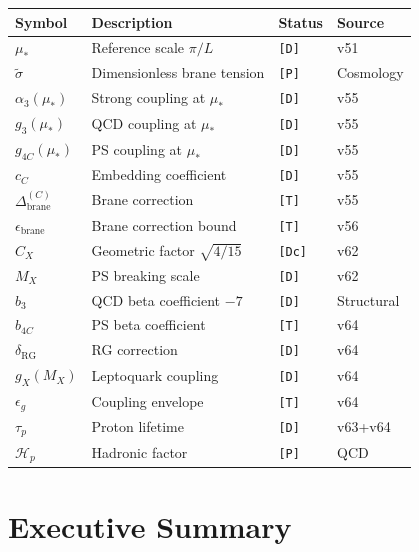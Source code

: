 \documentclass[11pt,a4paper]{article}
\newcommand{\tagD}{\textcolor{green!50!black}{\texttt{[D]}}}
\newcommand{\tagDc}{\textcolor{blue!70!black}{\texttt{[Dc]}}}
\newcommand{\tagP}{\textcolor{orange!80!black}{\texttt{[P]}}}
\newcommand{\tagT}{\textcolor{cyan!70!black}{\texttt{[T]}}}
\theoremstyle{definition}
\begin{document}
\begin{center}
\begin{longtable}{llll}
\toprule
Symbol & Description & Status & Source \\
\midrule
\endhead
$\mu_*$ & Reference scale $\pi/L$ & \tagD{} & v51 \\
$\tilde{\sigma}$ & Dimensionless brane tension & \tagP{} & Cosmology \\
$\alpha_3(\mu_*)$ & Strong coupling at $\mu_*$ & \tagD{} & v55 \\
$g_3(\mu_*)$ & QCD coupling at $\mu_*$ & \tagD{} & v55 \\
$g_{4C}(\mu_*)$ & PS coupling at $\mu_*$ & \tagD{} & v55 \\
$c_C$ & Embedding coefficient & \tagD{} & v55 \\
$\Delta_{\text{brane}}^{(C)}$ & Brane correction & \tagT{} & v55 \\
$\epsilon_{\text{brane}}$ & Brane correction bound & \tagT{} & v56 \\
$C_X$ & Geometric factor $\sqrt{4/15}$ & \tagDc{} & v62 \\
$M_X$ & PS breaking scale & \tagD{} & v62 \\
$b_3$ & QCD beta coefficient $-7$ & \tagD{} & Structural \\
$b_{4C}$ & PS beta coefficient & \tagT{} & v64 \\
$\delta_{\text{RG}}$ & RG correction & \tagD{} & v64 \\
$g_X(M_X)$ & Leptoquark coupling & \tagD{} & v64 \\
$\epsilon_g$ & Coupling envelope & \tagT{} & v64 \\
$\tau_p$ & Proton lifetime & \tagD{} & v63+v64 \\
$\mathcal{H}_p$ & Hadronic factor & \tagP{} & QCD \\
\bottomrule
\end{longtable}
\end{center}

\section{Executive Summary}
\label{sec:executive}
\end{document}

